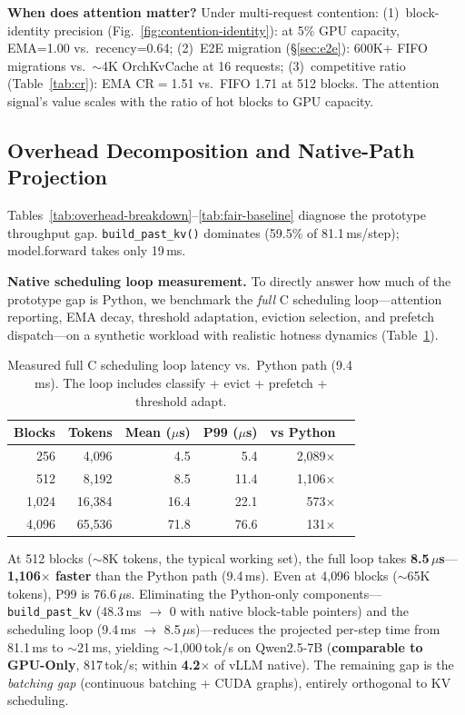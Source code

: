 \documentclass[conference]{IEEEtran}
\begin{document}
\textbf{When does attention matter?} Under multi-request contention: (1)~block-identity precision (Fig.~\ref{fig:contention-identity}): at 5\% GPU capacity, EMA=1.00 vs.\ recency=0.64; (2)~E2E migration (\S\ref{sec:e2e}): 600K+ FIFO migrations vs.\ ${\sim}$4K OrchKvCache at 16 requests; (3)~competitive ratio (Table~\ref{tab:cr}): EMA CR$=$1.51 vs.\ FIFO 1.71 at 512 blocks. The attention signal's value scales with the ratio of hot blocks to GPU capacity.

\subsection{Overhead Decomposition and Native-Path Projection}
\label{sec:overhead}

Tables~\ref{tab:overhead-breakdown}--\ref{tab:fair-baseline} diagnose the prototype throughput gap. \texttt{build\_past\_kv()} dominates (59.5\% of 81.1\,ms/step); model.forward takes only 19\,ms.

\textbf{Native scheduling loop measurement.} To directly answer how much of the prototype gap is Python, we benchmark the \emph{full} C scheduling loop---attention reporting, EMA decay, threshold adaptation, eviction selection, and prefetch dispatch---on a synthetic workload with realistic hotness dynamics (Table~\ref{tab:native-loop}).

\begin{table}[t]
\centering
\caption{Measured full C scheduling loop latency vs.\ Python path (9.4\,ms). The loop includes classify + evict + prefetch + threshold adapt.}
\label{tab:native-loop}
\small
\setlength{\tabcolsep}{5pt}
\begin{tabular}{@{}rrrrrr@{}}
\toprule
Blocks & Tokens & Mean ($\mu$s) & P99 ($\mu$s) & vs Python \\
\midrule
256  & 4{,}096  & 4.5  & 5.4  & 2{,}089$\times$ \\
512  & 8{,}192  & 8.5  & 11.4 & 1{,}106$\times$ \\
1{,}024 & 16{,}384 & 16.4 & 22.1 & 573$\times$ \\
4{,}096 & 65{,}536 & 71.8 & 76.6 & 131$\times$ \\
\bottomrule
\end{tabular}
\end{table}

At 512 blocks (${\sim}$8K tokens, the typical working set), the full loop takes \textbf{8.5\,$\mu$s}---\textbf{1{,}106$\times$ faster} than the Python path (9.4\,ms). Even at 4{,}096 blocks (${\sim}$65K tokens), P99 is 76.6\,$\mu$s. Eliminating the Python-only components---\texttt{build\_past\_kv} (48.3\,ms $\to$ 0 with native block-table pointers) and the scheduling loop (9.4\,ms $\to$ 8.5\,$\mu$s)---reduces the projected per-step time from 81.1\,ms to ${\sim}$21\,ms, yielding ${\sim}$1{,}000\,tok/s on Qwen2.5-7B (\textbf{comparable to GPU-Only}, 817\,tok/s; within \textbf{4.2$\times$} of vLLM native). The remaining gap is the \emph{batching gap} (continuous batching + CUDA graphs), entirely orthogonal to KV scheduling.
\end{document}
